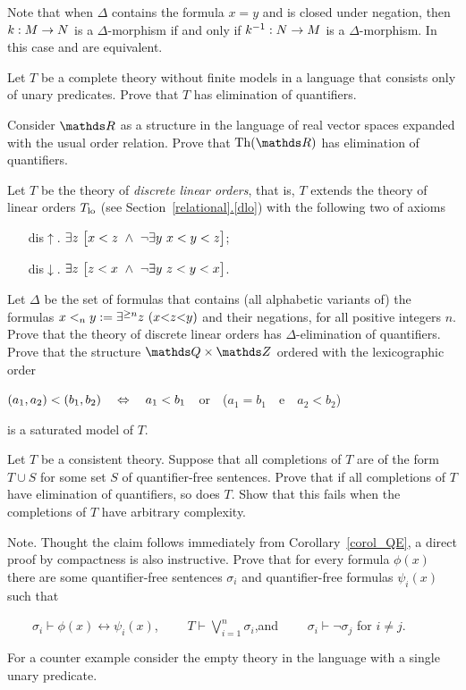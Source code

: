 Note that when $\Delta$ contains the formula $x=y$ and is closed under negation, then  $k:M\rightarrow N$ is a $\Delta$-morphism if and only if $k^{-1}:N\rightarrow M$ is a $\Delta$-morphism. In this case  and  are equivalent.

\begin{exercise}
Let $T$ be a complete theory without finite models in a language that consists only of unary predicates. Prove that $T$ has elimination of quantifiers.\QED
\end{exercise}

\begin{exercise}
Consider $\RR$ as a structure in the language of real vector spaces expanded with the usual order relation. Prove that $\Th(\RR)$ has elimination of quantifiers.\QED
\end{exercise}

\begin{exercise}\label{ex_discrete_lo}
Let $T$ be the theory of \emph{discrete linear orders}, that is, $T$ extends the theory of linear orders $T_{\rm lo}$  (see Section~\hyperref[dlo]{\ref*{relational}.\ref*{dlo}}) with the following two of axioms
\begin{itemize}
\item[dis$\uparrow$.] $\E z\ \big[x<z\ \wedge\ \neg\E y\ x<y<z\big]$;
\item[dis$\downarrow$.] $\E z\ \big[ z<x\ \wedge\ \neg\E y\ z<y<x\big]$.
\end{itemize}
Let $\Delta$ be the set of formulas that contains (all alphabetic variants of) the formulas $x<_ny:=\E^{\ge n}z\ (x\mathord<z\mathord< y)$ and their negations, for all positive integers $n$. Prove that the theory of discrete linear orders has $\Delta$-elimination of quantifiers. Prove that the structure $\QQ\times\ZZ$ ordered with the lexicographic order 

\hfil$(a_1,a_2)<(b_1,b_2)\quad\Leftrightarrow\quad a_1<b_1$\ \ or\ \ ($a_1=b_1$\ \ e\ \ $a_2<b_2$)

is a saturated model of $T$.\QED
\end{exercise}



\begin{exercise}
Let $T$ be a consistent theory. Suppose that all completions of $T$ are of the form 
$T\cup S$ for some set $S$ of quantifier-free sentences. Prove that if all completions of $T$ have elimination of quantifiers, so does $T$. Show that this fails when the completions of $T$ have arbitrary complexity. 

Note. Thought the claim follows immediately from Corollary~\ref{corol_QE}, a direct proof by compactness is also instructive. Prove that for every formula $\phi(x)$ there are some quantifier-free sentences $\sigma_i$ and quantifier-free formulas $\psi_i(x)$ such that

$\displaystyle\qquad\sigma_i\vdash\phi(x)\leftrightarrow\psi_i(x)$, 
$\qquad\displaystyle T\vdash\bigvee^n_{i=1}\sigma_i$,\qquad and  $\qquad\sigma_i\vdash\neg\sigma_j$ for $i\neq j$.

For a counter example consider the empty theory in the language with a single unary predicate.\QED
\end{exercise}


